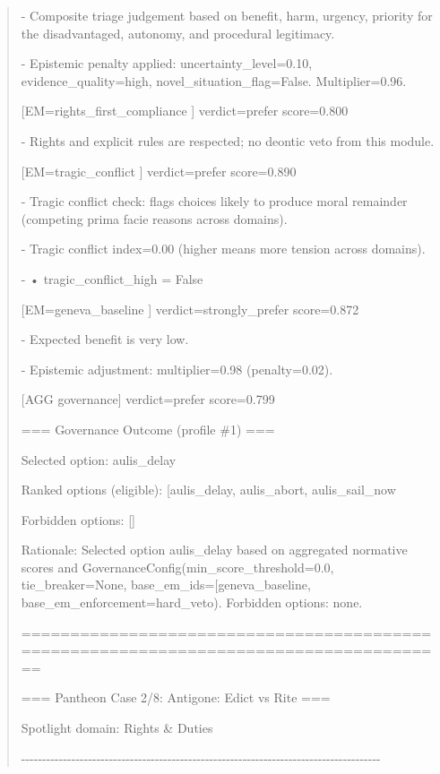 \documentclass[12pt]{article}
\theoremstyle{plain}
\theoremstyle{definition}
\theoremstyle{remark}
\begin{document}
\begin{quote}
- Composite triage judgement based on benefit, harm, urgency, priority
for the disadvantaged, autonomy, and procedural legitimacy.

- Epistemic penalty applied: uncertainty\_level=0.10,
evidence\_quality=high, novel\_situation\_flag=False. Multiplier=0.96.

{[}EM=rights\_first\_compliance {]} verdict=prefer score=0.800

- Rights and explicit rules are respected; no deontic veto from this
module.

{[}EM=tragic\_conflict {]} verdict=prefer score=0.890

- Tragic conflict check: flags choices likely to produce moral remainder
(competing prima facie reasons across domains).

- Tragic conflict index=0.00 (higher means more tension across domains).

- • tragic\_conflict\_high = False

{[}EM=geneva\_baseline {]} verdict=strongly\_prefer score=0.872

- Expected benefit is very low.

- Epistemic adjustment: multiplier=0.98 (penalty=0.02).

{[}AGG governance{]} verdict=prefer score=0.799

=== Governance Outcome (profile \#1) ===

Selected option: \textquotesingle aulis\_delay\textquotesingle{}

Ranked options (eligible):
{[}\textquotesingle aulis\_delay\textquotesingle,
\textquotesingle aulis\_abort\textquotesingle,
\textquotesingle aulis\_sail\_now\textquotesingle{]}

Forbidden options: {[}{]}

Rationale: Selected option
\textquotesingle aulis\_delay\textquotesingle{} based on aggregated
normative scores and GovernanceConfig(min\_score\_threshold=0.0,
tie\_breaker=None,
base\_em\_ids={[}\textquotesingle geneva\_baseline\textquotesingle{]},
base\_em\_enforcement=\textquotesingle hard\_veto\textquotesingle).
Forbidden options: none.

======================================================================================

=== Pantheon Case 2/8: Antigone: Edict vs Rite ===

Spotlight domain: Rights \& Duties

-\/-\/-\/-\/-\/-\/-\/-\/-\/-\/-\/-\/-\/-\/-\/-\/-\/-\/-\/-\/-\/-\/-\/-\/-\/-\/-\/-\/-\/-\/-\/-\/-\/-\/-\/-\/-\/-\/-\/-\/-\/-\/-\/-\/-\/-\/-\/-\/-\/-\/-\/-\/-\/-\/-\/-\/-\/-\/-\/-\/-\/-\/-\/-\/-\/-\/-\/-\/-\/-\/-\/-\/-\/-\/-\/-\/-\/-\/-\/-\/-\/-\/-\/-\/-\/-


\end{quote}
\end{document}
